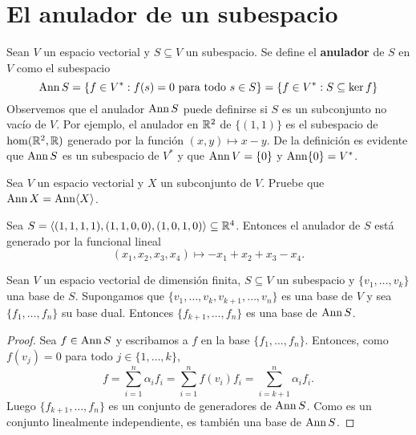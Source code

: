 \section{El anulador de un subespacio}

\begin{block}
	Sean $V$ un espacio vectorial y $S\subseteq V$ un subespacio. Se define el
	\textbf{anulador} de $S$ en $V$ como el subespacio
	\[
	\operatorname{Ann} S=\{f\in V^*:f(s)=0\text{ para todo $s\in S$}\}=\{f\in V^*: S\subseteq\ker f\}
	\]
    Observemos que el anulador $\operatorname{Ann} S$ puede definirse si $S$ es un
    subconjunto no vacío de $V$. Por ejemplo, el anulador en $\mathbb{R}^2$ de
    $\{(1,1)\}$ es el subespacio de $\hom(\mathbb{R}^2,\mathbb{R})$ generado por la función
    $(x,y)\mapsto x-y$.  De la definición es evidente que $\operatorname{Ann} S$ es un
    subespacio de $V^*$ y que $\operatorname{Ann} V=\{0\}$ y $\operatorname{Ann}\{0\}=V^*$. 
\end{block}

\begin{xca}
    \label{xca:annX=<X>}
	Sea $V$ un espacio vectorial y $X$ un subconjunto de $V$. Pruebe que $\operatorname{Ann}
	X=\operatorname{Ann}\langle X\rangle$.
\end{xca}

\begin{example}
	Sea $S=\langle(1,1,1,1),(1,1,0,0),(1,0,1,0)\rangle\subseteq\mathbb{R}^4$. Entonces
	el anulador de $S$ está generado por la funcional lineal 
	\[
		(x_1,x_2,x_3,x_4)\mapsto -x_1+x_2+x_3-x_4.
	\]
\end{example}

\begin{lem}
	\label{lem:dual:fundamental}
	Sean $V$ un espacio vectorial de dimensión finita, $S\subseteq V$ un
	subespacio y $\{v_1,\dots,v_k\}$ una base de $S$. Supongamos que
	$\{v_1,\dots,v_k,v_{k+1},\dots,v_n\}$ es una base de $V$ y sea
	$\{f_1,\dots,f_n\}$ su base dual. Entonces $\{f_{k+1},\dots,f_n\}$ es una
	base de $\operatorname{Ann} S$.

	\begin{proof}
		Sea $f\in\operatorname{Ann} S$ y escribamos a $f$ en la base $\{f_1,\dots,f_n\}$.
		Entonces, como $f(v_j)=0$ para todo $j\in\{1,\dots,k\}$, 
		\[
		f=\sum_{i=1}^n\alpha_if_i=\sum_{i=1}^n f(v_i)f_i=\sum_{i=k+1}^n\alpha_if_i.
		\]
		Luego $\{f_{k+1},\dots,f_n\}$ es un conjunto de generadores de $\operatorname{Ann} S$. Como es
		un conjunto linealmente independiente, es también una base de $\operatorname{Ann} S$.
	\end{proof}
\end{lem}

